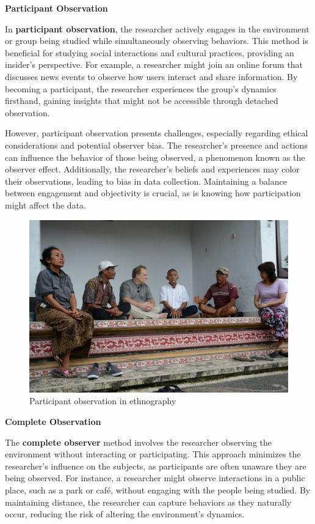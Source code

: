 \documentclass[
]{book}
\begin{document}
\textbf{Participant Observation}

In \textbf{participant observation}, the researcher actively engages in the environment or group being studied while simultaneously observing behaviors. This method is beneficial for studying social interactions and cultural practices, providing an insider's perspective. For example, a researcher might join an online forum that discusses news events to observe how users interact and share information. By becoming a participant, the researcher experiences the group's dynamics firsthand, gaining insights that might not be accessible through detached observation.

However, participant observation presents challenges, especially regarding ethical considerations and potential observer bias. The researcher's presence and actions can influence the behavior of those being observed, a phenomenon known as the observer effect. Additionally, the researcher's beliefs and experiences may color their observations, leading to bias in data collection. Maintaining a balance between engagement and objectivity is crucial, as is knowing how participation might affect the data.

\begin{figure}
\centering
\includegraphics[width=1\linewidth,height=\textheight,keepaspectratio]{images/part-observation.jpg}
\caption{Participant observation in ethnography}
\end{figure}

\textbf{Complete Observation}

The \textbf{complete observer} method involves the researcher observing the environment without interacting or participating. This approach minimizes the researcher's influence on the subjects, as participants are often unaware they are being observed. For instance, a researcher might observe interactions in a public place, such as a park or café, without engaging with the people being studied. By maintaining distance, the researcher can capture behaviors as they naturally occur, reducing the risk of altering the environment's dynamics.
\end{document}
